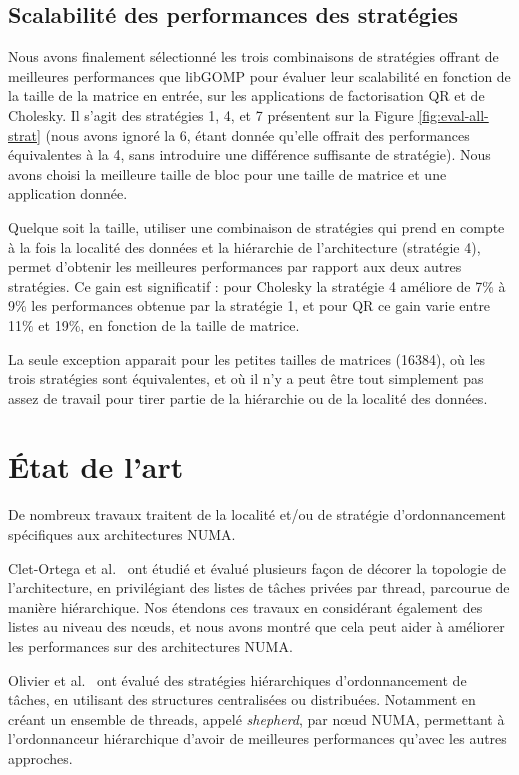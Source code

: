 \documentclass[parallelisme]{compas2016}
\begin{document}
\subsection{Scalabilité des performances des stratégies}


Nous avons finalement sélectionné les trois combinaisons de stratégies offrant de meilleures
performances que libGOMP pour évaluer leur scalabilité en fonction de la taille
de la matrice en entrée, sur les applications de factorisation QR et de Cholesky. Il s'agit des stratégies 1,
4, et 7 présentent sur la Figure \ref{fig:eval-all-strat} (nous avons ignoré la 6, étant donnée
qu'elle offrait des performances équivalentes à la 4, sans introduire une différence suffisante de stratégie).
Nous avons choisi la meilleure taille de bloc pour une taille de matrice et une application donnée.


Quelque soit la taille, utiliser une combinaison de stratégies qui prend en compte à la fois
la localité des données et la hiérarchie de l'architecture (stratégie 4),
permet d'obtenir les meilleures performances par rapport aux deux autres stratégies.
Ce gain est significatif : pour Cholesky la stratégie 4 améliore de 7\% à 9\% les
performances obtenue par la stratégie 1, et pour QR ce gain varie entre 11\% et 19\%,
en fonction de la taille de matrice.

La seule exception apparait pour les petites tailles de matrices (16384), où les
trois stratégies sont équivalentes, et où il n'y a peut être tout simplement pas
assez de travail pour tirer partie de la hiérarchie ou de la localité des données.

\vspace*{-1ex}
\section{État de l'art}
\label{sec:related-work}

De nombreux travaux traitent de la localité et/ou de stratégie d'ordonnancement
spécifiques aux architectures NUMA.

Clet-Ortega et al.~\cite{DBLP:conf/europar/Clet-OrtegaCP14} ont étudié et évalué plusieurs
façon de décorer la topologie de l'architecture, en privilégiant des listes de tâches
privées par thread, parcourue de manière hiérarchique. Nos étendons ces travaux
en considérant également des listes au niveau des nœuds, et nous avons montré
que cela peut aider à améliorer les performances sur des architectures NUMA.

Olivier et al.~\cite{DBLP:journals/ijhpca/OlivierPWSP12} ont évalué des stratégies
hiérarchiques d'ordonnancement de tâches, en utilisant des structures centralisées
ou distribuées. Notamment en créant un ensemble de threads, appelé \emph{shepherd}, par
nœud NUMA, permettant à l'ordonnanceur hiérarchique d'avoir de meilleures performances
qu'avec les autres approches.
\end{document}
